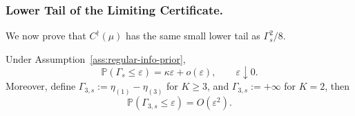 \documentclass[10pt]{article}
\theoremstyle{plain}
\begin{document}
\subsubsection{Lower Tail of the Limiting Certificate.}

We now prove that \(C^\dagger(\mu)\) has the same small lower tail as
\(\Gamma_s^2/8\).

\begin{lemma}
\label{lem:top-gap-triple-simple-upper}
Under Assumption~\ref{ass:regular-info-prior},
\[
    \mathbb P(\Gamma_s\le\varepsilon)
    =
    \kappa\varepsilon+o(\varepsilon),
    \qquad
    \varepsilon\downarrow0.
\]
Moreover, define 
$\Gamma_{3,s}:=\eta_{(1)}-\eta_{(3)}$ 
for \(K\ge3\), and \(\Gamma_{3,s}:=+\infty\) for \(K=2\), then
\[
    \mathbb P(\Gamma_{3,s}\le\varepsilon)
    =
    O(\varepsilon^2).
\]
\end{lemma}
\end{document}
